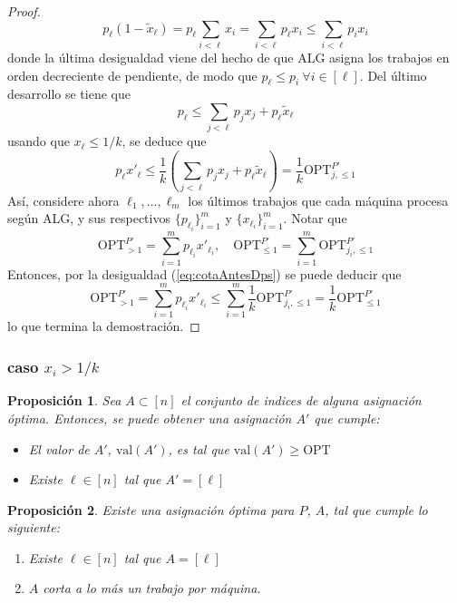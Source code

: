 \documentclass[10pt]{article}
\newcommand{\val}[1]{\text{val}(#1)}
\theoremstyle{plain}
\newtheorem{prop}{Proposición}
\theoremstyle{definition}
\begin{document}
\begin{proof}
\begin{equation*}
 p_\ell(1-\tilde{x}_\ell) = p_\ell\sum_{i < \ell} x_i = \sum_{i < \ell} p_\ell x_i \leq  \sum_{i < \ell} p_i x_i
\end{equation*}
donde la última desigualdad viene del hecho de que ALG asigna los trabajos en orden decreciente de pendiente, de modo que $p_\ell \leq p_i \ \forall i \in [\ell]$. Del último desarrollo se tiene que
\begin{equation}
\label{eq:cotasGan}
p_\ell \leq \sum_{j < \ell} p_j x_j + p_\ell \tilde{x}_\ell
\end{equation}
usando que $x_\ell \leq 1/k$, se deduce que
\begin{equation}
\label{eq:cotaAntesDps}
p_\ell x'_\ell \leq \frac{1}{k}\left(\sum_{j < \ell} p_j x_j + p_\ell \tilde{x}_\ell \right) = \frac{1}{k}\text{OPT}^{P'}_{j,\leq 1}
\end{equation}
Así, considere ahora $\ell_1, \ldots, \ell_m$ los \'ultimos trabajos que cada m\'aquina procesa seg\'un ALG, y sus respectivos $\{p_{\ell_i}\}_{i=1}^m$ y $\{x_{\ell_i}\}_{i=1}^m$. Notar que
$$
\text{OPT}^{P'}_{>1} = \sum_{i = 1}^m p_{\ell_i}x'_{\ell_i}, \quad   \text{OPT}^{P'}_{\leq 1}  = \sum_{i=1}^m \text{OPT}^{P'}_{j_i,\leq 1}  
$$
Entonces, por la desigualdad (\ref{eq:cotaAntesDps}) se puede deducir que
\begin{equation*}
\text{OPT}^{P'}_{>1} = \sum_{i = 1}^m p_{\ell_i} x'_{\ell_i} \leq \sum_{i=1}^m \frac{1}{k} \text{OPT}^{P'}_{j_i,\leq 1} = \frac{1}{k} \text{OPT}^{P'}_{\leq 1}
\end{equation*}
lo que termina la demostración.
\end{proof}
\subsubsection{caso $x_i >1/k$}
\newpage
\begin{prop}
Sea $A\subset [n]$ el conjunto de indices de alguna asignaci\'on \'optima. Entonces, se puede obtener una 
asignaci\'on  $A'$ que cumple:
\begin{itemize}
\item El valor de $A'$, $\val{A'}$, es tal que $\val{A'} \geq \text{OPT}$
\item Existe $\ell \in [n]$ tal que $A' = [\ell]$ 
\end{itemize}
\end{prop}

\begin{prop}
Existe una asignación óptima para $P$, $A$, tal que cumple lo siguiente:
\begin{enumerate}
\item Existe $\ell \in [n]$ tal que $A = [\ell]$
\item $A$ corta a lo m\'as un trabajo por m\'aquina.
\end{enumerate}
\end{prop}
\end{document}
